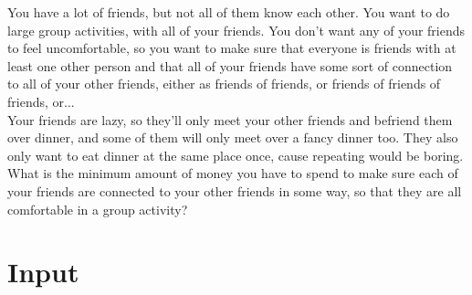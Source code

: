

\indent You have a lot of friends, but not all of them know each other. You want to do large group activities, with all of your friends. You don't want any of your friends to feel uncomfortable, so you want to make sure that everyone is friends with at least one other person and that all of your friends have some sort of connection to all of your other friends, either as friends of friends, or friends of friends of friends, or...\\ 
\indent Your friends are lazy, so they'll only meet your other friends and befriend them over dinner, and some of them will only meet over a fancy dinner too. They also only want to eat dinner at the same place once, cause repeating would be boring. What is the minimum amount of money you have to spend to make sure each of your friends are connected to your other friends in some way, so that they are all comfortable in a group activity?\\


\section*{Input}

